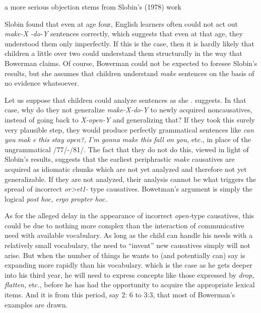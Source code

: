 a more serious objection stems from Slobin's (1978) work


Slobin found that even at age four, English learners often could not act out \textit{make-X} \textit{-do-Y} sentences correctly, which suggests that even at that age, they understood them only imperfectly. If this is the case, then it is hardly likely that children a little over two could understand them structurally in the way that Bowerman claims. Of course, Bower\-man could not be expected to foresee Slobin's results, but she assumes that children understand \textit{make} sentences on the basis of no evidence whatsoever.

Let us suppose that children could analyze sentences as she . suggests. In that case, why do they not generalize \textit{make-X-do-Y }to newly acquired noncausatives, instead of going back to \textit{X-open-Y} and generalizing that? If they took this surely very plausible step, they would produce perfectly grammatical sentences like \textit{can you} \textit{mak} \textit{e} \textit{this} \textit{stay} \textit{open?,} \textit{I'm} \textit{gonna} \textit{make} \textit{this} \textit{fall on} \textit{you,} etc., in place of the ungrammatical /77/-/81/. The fact that they do not do this, viewed in light of Slobin's results, suggests that the earliest periphrastic \textit{make }causatives are acquired as idiomatic chunks which are not yet analyzed and therefore not yet generalizable. If they are not analyzed, their analysis cannot be what triggers the spread of incorrect \textit{or{\textgreater}et1-} type causatives. Bowetman's argument is simply the logical
\textit{post} \textit{hoc,} \textit{ergo} \textit{propter} \textit{hoc.}

As for the alleged delay in the appearance of incorrect \textit{open-}type causatives, this could be due to nothing more complex than the interaction of communicative need with available vocabulary. As long as the child can handle his needs with a relatively small vocabulary, the need to ``invent'' new causatives simply will not arise. But when the number of things he wants to (and potentially can) say is expanding more rapidly than his vocabulary. which is the case as he gets deeper into his third year, he will need to express concepts like those expressed by \textit{drop,} \textit{flatten,} etc., before he has had the opportunity to acquire the appropriate lexical items. And it is from this period, say 2: 6 to 3:3, that most of Bowerman's examples are drawn.

